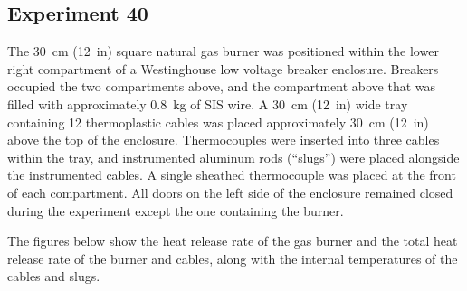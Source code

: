\documentclass[12pt]{article}
\begin{document}
\subsection{Experiment 40}

The 30~cm (12~in) square natural gas burner was positioned within the lower right compartment of a Westinghouse low voltage breaker enclosure. Breakers occupied the two compartments above, and the compartment above that was filled with approximately 0.8~kg of SIS wire.
A 30~cm (12~in) wide tray containing 12 thermoplastic cables was placed approximately 30~cm (12~in) above the top of the enclosure. Thermocouples were inserted into three cables within the tray, and instrumented aluminum rods (``slugs'') were placed alongside the instrumented cables. A single sheathed thermocouple was placed at the front of each compartment. All doors on the left side of the enclosure remained closed during the experiment except the one containing the burner.

The figures below show the heat release rate of the gas burner and the total heat release rate of the burner and cables, along with the internal temperatures of the cables and slugs.
\end{document}
